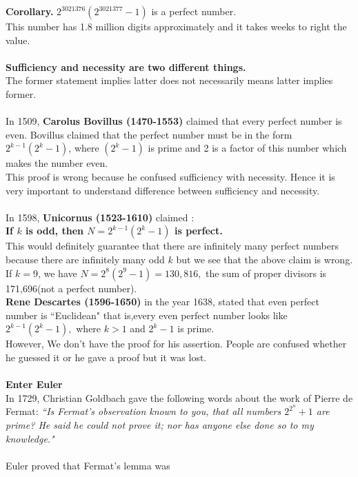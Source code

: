 \documentclass[a4paper,11pt]{article}
\begin{document}
\noindent \textbf{Corollary.} $ 2^
{3021376}(2^{3021377} - 1)$ is a perfect number.\\
This number has 1.8 million digits approximately and it takes weeks to  right the value.\\
\\
\noindent \textbf{Sufficiency and necessity are two different things.}\\The former statement implies latter does not necessarily means latter implies former. \\
\\
\noindent In 1509, \textbf{Carolus Bovillus (1470-1553)} claimed that every perfect number is even. 
Bovillus claimed that the perfect number must be in the form $2^
{k- 1 }(2^k - 1 )$, 
where $(2^k - 1)$ is prime and 2 is a factor of this number which makes the number even.\\
This proof is wrong because he confused sufficiency with necessity. Hence it is very important to understand difference between sufficiency and necessity.\\
\\
In 1598,  \textbf{Unicornus (1523-1610)} claimed :
\\
\noindent \textbf{ If $k$ is odd, then $ N = 2^
{k-1 }(2^k - 1) $ is perfect.} \\
This would definitely guarantee that there are infinitely many perfect numbers because
 there are infinitely many odd $k$ but we see that the above claim is wrong.\\ If $k = 9$, we have 
$N = 2^
8
(2^9 - 1) = 130,816,$ the sum of proper divisors is 171,696(not a perfect number).
\\
\textbf{Rene Descartes 
(1596-1650)} in the year 1638, stated that
even perfect number is ``Euclidean" that is,every even perfect number looks 
like $ 2^
{k-1}
(2^k - 1 ),$ where $ k > 1$ and $2^k-1$ is prime.\\
However, We don't have the proof for his assertion. People are confused whether he guessed it or he gave a proof but it was lost.\\
\\
\textbf{Enter Euler}\\
In 1729, Christian Goldbach gave the following words about the work of Pierre de Fermat: 
\textit{``Is Fermat's observation known to you, that all numbers $2^{2^n} + 1$ are 
prime? He said he could not prove it; nor has anyone else done so to 
my knowledge."}\\
\\
Euler proved that Fermat's lemma was 
\end{document}
